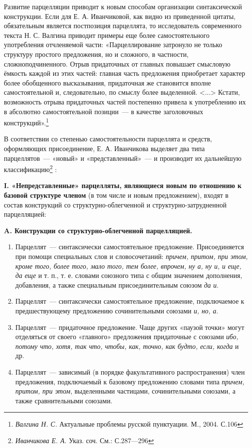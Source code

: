 \documentclass{kursa4}
\begin{document}
{      {Развитие парцелляции приводит к новым способам
      организации синтаксической конструкции. Если для Е. А. Иванчиковой, как
      видно из приведенной цитаты, обязательным является постпозиция
      парцеллята, то исследователь современного текста Н. С. Валгина приводит
      примеры еще более самостоятельного употребления отчленяемой части:
      «Парцеллирование затронуло не только структуру простого предложения, но
      и сложного, в частности, сложноподчиненного. Отрыв придаточных от
      главных повышает смысловую ёмкость каждой из этих частей: главная часть
      предложения }{приобретает характер более
      обо}{б}{щенного высказывания,
      придаточная же становится вполне самостоятельной и, следовательно, по
      смыслу более выделенной. \textless{}...\textgreater{} Кстати,
      возможность отрыва придаточных частей постепенно привела к употреблению
      их в абсолютно самостоятельной позиции~--- в качестве заголовочных
      конструкций».}\footnote{\textit{{ Валгина Н. С.
      }}{Актуальные проблемы русской пунктуации. М., 2004.
      С.106}}{ }

      {В соответствии со степенью самостоятельности
      парцеллята и средств, оформляющих присоединение, Е. А. Иванчикова
      выделяет два типа парцеллятов~--- «новый» и «представленный»~--- и
      производит их дальнейшую
      классификацию}\footnote{\textit{{Иванчикова Е. А.
      }}{Указ. соч. См.: С.287—296}}{ :}

      \textbf{I. «Непредставленные» парцелляты, являющиеся
      новым по отношению к базовой структуре членом} (в том числе и
      новым предложением), входят в состав конструкций со
      структурно-облегченной и структурно-затрудненной парцелляцией:

      {\centering
      \textbf{A. Конструкции со структурно-облегченной
      парцелляцией.}}
      \begin{enumerate}
        \item Парцеллят~--- синтаксически самостоятельное
        предложение. Присоединяется при помощи специальных слов и
        словосочетаний: \textit{причем, притом, при этом,
        кроме того, более того, мало того, тем более, впрочем, ну а, ну и, и
        еще, да еще} и т. п., т. е. словами союзного типа с общим значением дополнения, добавления, а также специальным присоединительным союзом \textit{да и}.
        \item Парцеллят~--- синтаксически самостоятельное
        предложение, подключаемое к предшествующему предложению сочинительными
        союзами \textit{и, но, а}.
        \item Парцеллят~--- придаточное предложение. Чаще других
        «паузой точки» могут отделяться от своего «главного» предложения
        придаточные с союзами \textit{ибо, потому что, хотя,
        так что, чтобы, как, точно, как будто, если, когда}
        и др.
        \item Парцеллят~--- зависимый (в порядке факультативного распространения) член предложения, подключаемый к
        базовому предложению словами типа \textit{причем,
        притом, при этом}, выделенными частицами,
        сочинительными союзами, а также сравнительными союзами.
      \end{enumerate}

}
\end{document}
